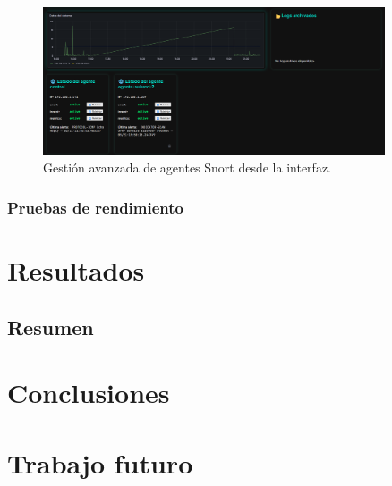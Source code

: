 \documentclass[11pt,a4paper,twoside]{report}
\begin{document}
\begin{figure}[H]
	\centering
	\includegraphics[width=0.9\textwidth]{configuracion/10.png}
	\caption{Gestión avanzada de agentes Snort desde la interfaz.}
	\label{fig:estado-multiple-agentes}
\end{figure}

\subsection{Pruebas de rendimiento}






\clearpage
\null
\thispagestyle{empty}
\newpage
\chapter{Resultados}

\section{Resumen}


\clearpage
\null
\thispagestyle{empty}
\newpage
\thispagestyle{empty}
\chapter*{Conclusiones}


\clearpage
\null
\thispagestyle{empty}
\newpage
\chapter*{Trabajo futuro}

\cleardoublepage %
\end{document}
